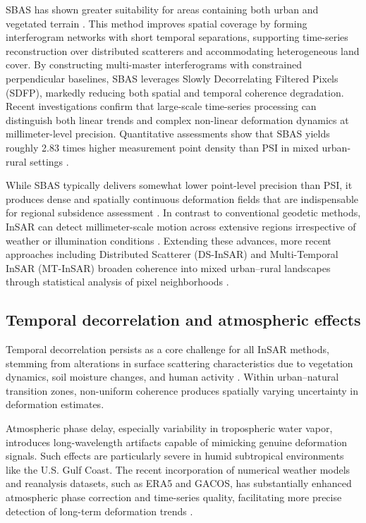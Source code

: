 \documentclass[oneside,doublespacing,flushright]{lsuthesis}
\begin{document}
SBAS has shown greater suitability for areas containing both urban and vegetated terrain \citep{Berardino2002}. This method improves spatial coverage by forming interferogram networks with short temporal separations, supporting time-series reconstruction 
over distributed scatterers and accommodating heterogeneous land cover. By constructing multi-master interferograms with constrained perpendicular baselines, SBAS leverages Slowly Decorrelating Filtered Pixels (SDFP), markedly reducing both spatial and temporal coherence degradation. 
Recent investigations confirm that large-scale time-series processing can distinguish both linear trends and complex non-linear deformation dynamics at millimeter-level precision. Quantitative assessments show that SBAS yields roughly 2.83 times higher measurement point density than PSI in mixed urban-rural settings \citep{Bayik2025}.

While SBAS typically delivers somewhat lower point-level precision than PSI, it produces dense and spatially continuous deformation fields that are indispensable for regional subsidence assessment \citep{Crosetto2016}. In contrast to conventional geodetic methods, InSAR can detect millimeter-scale motion across extensive regions irrespective of weather or illumination conditions \citep{Crosetto2016}. Extending these advances, more recent approaches including Distributed Scatterer (DS-InSAR) and Multi-Temporal InSAR (MT-InSAR) broaden coherence into mixed urban--rural landscapes through statistical analysis of pixel neighborhoods \citep{Fattahi2015}.

\subsection{Temporal decorrelation and atmospheric effects}

Temporal decorrelation persists as a core challenge for all 
InSAR methods, stemming from alterations in surface scattering characteristics due to vegetation dynamics, soil moisture changes, and human activity \citep{Zheng2024}.
Within urban--natural transition zones, non-uniform coherence produces spatially varying uncertainty in deformation estimates.

Atmospheric phase delay, especially variability in tropospheric water vapor, introduces long-wavelength artifacts capable of mimicking genuine deformation signals.
Such effects are particularly severe in humid subtropical environments like the U.S. Gulf Coast. The recent incorporation of numerical weather models and reanalysis datasets, such as ERA5 and GACOS, has substantially enhanced atmospheric phase correction and time-series quality, facilitating more precise detection of long-term deformation trends \citep{HosseinzadehLLand2024}.
\end{document}
